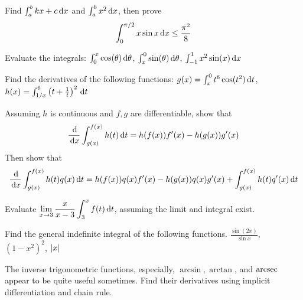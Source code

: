 \documentclass[Calculus 1 Recitation.tex]{subfiles}
\begin{document}
\begin{myleftlinebox}
	Find $\int_a^b kx+c\,\mathrm{d} x$ and $\int_a^b x^2\,\mathrm{d} x$, then prove 
	$$\int_0^{\pi/2} x\sin x \,\mathrm{d} x\leq \frac{\pi^2}{8}$$
	\tcblower
	\vspace{2em}
\end{myleftlinebox}

\begin{myleftlinebox}
	Evaluate the integrals: $\int_{0}^{x}\cos(\theta)\,\mathrm{d} \theta$, $\int_{x}^{0}\sin(\theta)\,\mathrm{d} \theta$, $\int_{-1}^1 x^2\sin(x) \,\mathrm{d} x$
	\tcblower
	\vspace{2em}
\end{myleftlinebox}

\begin{myleftlinebox}
	Find the derivatives of the following functions: $g(x)=\int_x^0 t^6\cos(t^2)\,\mathrm{d} t$, $h(x)=\int_{1/x}^6 \left( t+\frac{1}{t} \right)^2\,\mathrm{d} t$
	\tcblower
	\vspace{2em}
\end{myleftlinebox}

\begin{myleftlinebox}
	Assuming $h$ is continuous and $f,g$ are differentiable, show that
	\[\frac{\,\mathrm{d}}{\,\mathrm{d} x} \int_{g(x)}^{f(x)} h(t)\,\mathrm{d} t = h(f(x))f'(x)-h(g(x))g'(x)\]
	Then show that
	\[\frac{\,\mathrm{d}}{\,\mathrm{d} x} \int_{g(x)}^{f(x)} h(t)q(x)\,\mathrm{d} t = h(f(x))q(x)f'(x)-h(g(x))q(x)g'(x)+\int_{g(x)}^{f(x)} h(t)q'(x)\,\mathrm{d} t\]
	\tcblower
	\vspace{2em}
\end{myleftlinebox}

\begin{myleftlinebox}
	Evaluate $\displaystyle \lim_{x\to 3}\frac{x}{x-3}\int_3^x f(t)\,\mathrm{d} t$, assuming the limit and integral exist.
	\tcblower
	\vspace{2em}
\end{myleftlinebox}

\begin{myleftlinebox}
	Find the general indefinite integral of the following functions. $\frac{\sin(2x)}{\sin x}$, $(1-x^2)^2$, $\left\vert x\right\vert$
	\tcblower
	\vspace{2em}
\end{myleftlinebox}

\begin{myleftlinebox}
	The inverse trigonometric functions, especially, $\arcsin, \arctan$, and $\operatorname{arcsec}$ appear to be quite useful sometimes. Find their derivatives using implicit differentiation and chain rule.
	\tcblower
	\vspace{2em}
\end{myleftlinebox}
\end{document}
